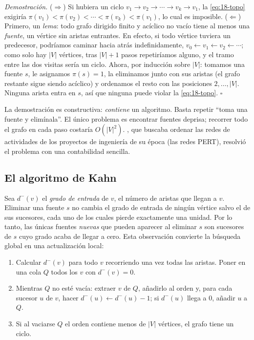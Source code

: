 \emph{Demostración.} ($\Rightarrow$) Si hubiera un ciclo $v_1\to v_2\to\cdots\to v_k\to v_1$, la \cref{eq:18-topo} exigiría $\pi(v_1)<\pi(v_2)<\cdots<\pi(v_k)<\pi(v_1)$, lo cual es imposible. ($\Leftarrow$) Primero, un \emph{lema}: todo grafo dirigido finito y acíclico no vacío tiene al menos una \emph{fuente}, un vértice sin aristas entrantes. En efecto, si todo vértice tuviera un predecesor, podríamos caminar hacia atrás indefinidamente, $v_0\leftarrow v_1\leftarrow v_2\leftarrow\cdots$; como solo hay $|V|$ vértices, tras $|V|+1$ pasos repetiríamos alguno, y el tramo entre las dos visitas sería un ciclo. Ahora, por inducción sobre $|V|$: tomamos una fuente $s$, le asignamos $\pi(s)=1$, la eliminamos junto con sus aristas (el grafo restante sigue siendo acíclico) y ordenamos el resto con las posiciones $2,\dots,|V|$. Ninguna arista entra en $s$, así que ninguna puede violar la \cref{eq:18-topo}. \hfill$\square$

La demostración es constructiva: \emph{contiene} un algoritmo. Basta repetir ``toma una fuente y elimínala''. El único problema es encontrar fuentes deprisa; recorrer todo el grafo en cada paso costaría $O(|V|^2)$. \textcite{c18-kahn1962}, que buscaba ordenar las redes de actividades de los proyectos de ingeniería de su época (las redes PERT), resolvió el problema con una contabilidad sencilla.

\subsection{El algoritmo de Kahn}

Sea $d^-(v)$ el \emph{grado de entrada} de $v$, el número de aristas que llegan a $v$. Eliminar una fuente $s$ no cambia el grado de entrada de ningún vértice salvo el de sus sucesores, cada uno de los cuales pierde exactamente una unidad. Por lo tanto, las únicas fuentes \emph{nuevas} que pueden aparecer al eliminar $s$ son sucesores de $s$ cuyo grado acaba de llegar a cero. Esta observación convierte la búsqueda global en una actualización local:

\begin{enumerate}
  \item Calcular $d^-(v)$ para todo $v$ recorriendo una vez todas las aristas. Poner en una cola $Q$ todos los $v$ con $d^-(v)=0$.
  \item Mientras $Q$ no esté vacía: extraer $v$ de $Q$, añadirlo al orden y, para cada sucesor $u$ de $v$, hacer $d^-(u)\leftarrow d^-(u)-1$; si $d^-(u)$ llega a 0, añadir $u$ a $Q$.
  \item Si al vaciarse $Q$ el orden contiene menos de $|V|$ vértices, el grafo tiene un ciclo.
\end{enumerate}

